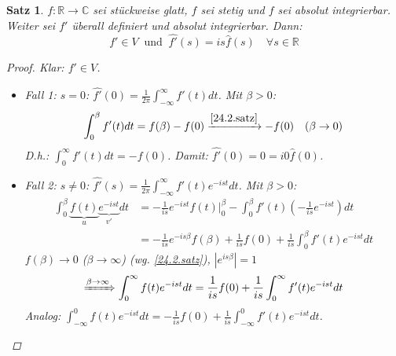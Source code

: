 \documentclass[12pt]{extreport} %
\newcommand{\C}{\mathbb{C}}
\newcommand{\R}{\mathbb{R}}
\theoremstyle{named}
\theoremstyle{nnamed}
\theoremstyle{itshape}
\newtheorem{satz}[unnamedtheorem]{Satz}
\theoremstyle{normal}
\begin{document}
\begin{satz} \label{24.7:satz}
	$f \colon \R \rightarrow \C$ sei stückweise glatt, $f$ sei stetig und $f$ sei absolut integrierbar. Weiter sei $f'$ überall definiert und absolut integrierbar. Dann:
	$$ f' \in V ~\text{ und } ~ \widehat{f'}(s) = is \hat{f}(s) \quad \forall s \in \R $$
	
	\begin{proof}
		Klar: $f' \in V$. 
		\begin{itemize}
			\item Fall 1: $s=0$: $\widehat{f'}(0) = \frac{1}{2\pi} \int_{-\infty}^{\infty} f'(t) dt$. Mit $\beta > 0$:
				$$ \int_{0}^{\beta} f'(t) dt = f(\beta) - f(0) \xrightarrow[]{\ref{24.2.satz}} -f(0) \quad (\beta \rightarrow 0) $$
				D.h.: $\int_{0}^{\infty} f'(t) dt = - f(0)$. Damit: $\widehat{f'}(0) = 0 = i0 \hat{f}(0)$.
			\item Fall 2: $s\neq0$: $\widehat{f'}(s) = \frac{1}{2\pi} \int_{-\infty}^{\infty} f'(t) e^{-ist} dt$. Mit $\beta > 0$: 
				\begin{align*}
					\int_{0}^{\beta} \underbrace{f(t)}_{u} \underbrace{e^{-ist}}_{v'} dt & = - \frac{1}{is} e^{-ist} f(t) \Big|_{0}^{\beta} - \int_{0}^{\beta} f'(t) \left( - \frac{1}{is} e^{-ist} \right) dt \\
					& = -\frac{1}{is} e^{-is\beta} f(\beta) + \frac{1}{is} f(0) + \frac{1}{is} \int_{0}^{\beta} f'(t) e^{-ist} dt
				\end{align*} 
				$f(\beta) \rightarrow 0$ ($\beta \rightarrow \infty$) (wg. \ref{24.2.satz}), $\left| e^{is\beta} \right| = 1$
				$$ \xRightarrow[]{\beta \rightarrow \infty} \int_{0}^{\infty} f(t) e^{-ist} dt = \frac{1}{is} f(0) + \frac{1}{is} \int_{0}^{\infty} f'(t) e^{-ist} dt $$
				Analog: $\int_{-\infty}^{0} f(t) e^{-ist} dt = -\frac{1}{is} f(0) + \frac{1}{is} \int_{-\infty}^{0} f'(t) e^{-ist} dt$.
		\end{itemize}
	\end{proof}
\end{satz}
\end{document}
